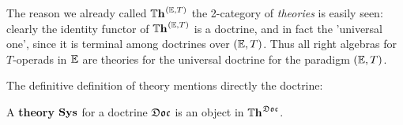 \begin{remark}
	The reason we already called $\Theories^\Paradigm$ the 2-category of \emph{theories} is easily seen: clearly the identity functor of $\Theories^\Paradigm$ is a doctrine, and in fact the 'universal one', since it is terminal among doctrines over $\Paradigm$.
	Thus all right algebras for $T$-operads in $\dblcat{E}$ are theories for the universal doctrine for the paradigm $\Paradigm$.

	The definitive definition of theory mentions directly the doctrine:
\end{remark}

\begin{definition}[Theory]
	A \textbf{theory} ${\mathbf{Sys}}$ for a doctrine ${\mathfrak{Doc}}$ is an object in $\Theories^\Doc$.
\end{definition}




